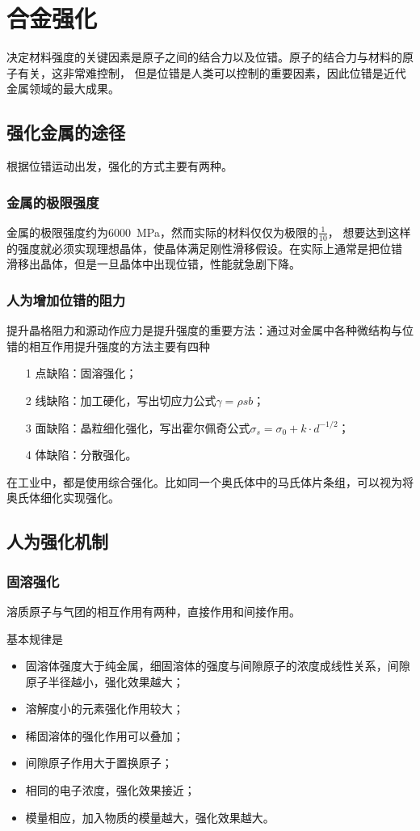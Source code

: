 \chapter{合金强化}
    决定材料强度的关键因素是原子之间的结合力以及位错。原子的结合力与材料的原子有关，这非常难控制，
    但是位错是人类可以控制的重要因素，因此位错是近代金属领域的最大成果。

    \section{强化金属的途径}
        根据位错运动出发，强化的方式主要有两种。
        \subsection{金属的极限强度}
            金属的极限强度约为\SI{6000}{\MPa}，然而实际的材料仅仅为极限的$\frac{1}{10}$，
            想要达到这样的强度就必须实现理想晶体，使晶体满足刚性滑移假设。在实际上通常是把位错
            滑移出晶体，但是一旦晶体中出现位错，性能就急剧下降。
        \subsection{人为增加位错的阻力}
            提升晶格阻力和源动作应力是提升强度的重要方法：通过对金属中各种微结构与位错的相互作用提升强度的方法主要有四种
            \begin{enumerate}
                \item[1] 点缺陷：固溶强化；
                \item[2] 线缺陷：加工硬化，写出切应力公式$\gamma=\rho sb$；
                \item[3] 面缺陷：晶粒细化强化，写出霍尔佩奇公式$\sigma_s=\sigma_0+k\cdot d^{-1/2}$；
                \item[4] 体缺陷：分散强化。
            \end{enumerate}
            在工业中，都是使用综合强化。比如同一个奥氏体中的马氏体片条组，可以视为将奥氏体细化实现强化。
    \section{人为强化机制}
        \subsection{固溶强化}
            溶质原子与气团的相互作用有两种，直接作用和间接作用。

            基本规律是
            \begin{itemize}
                \item 固溶体强度大于纯金属，细固溶体的强度与间隙原子的浓度成线性关系，间隙原子半径越小，强化效果越大；
                \item 溶解度小的元素强化作用较大；
                \item 稀固溶体的强化作用可以叠加；
                \item 间隙原子作用大于置换原子；
                \item 相同的电子浓度，强化效果接近；
                \item 模量相应，加入物质的模量越大，强化效果越大。
            \end{itemize}
